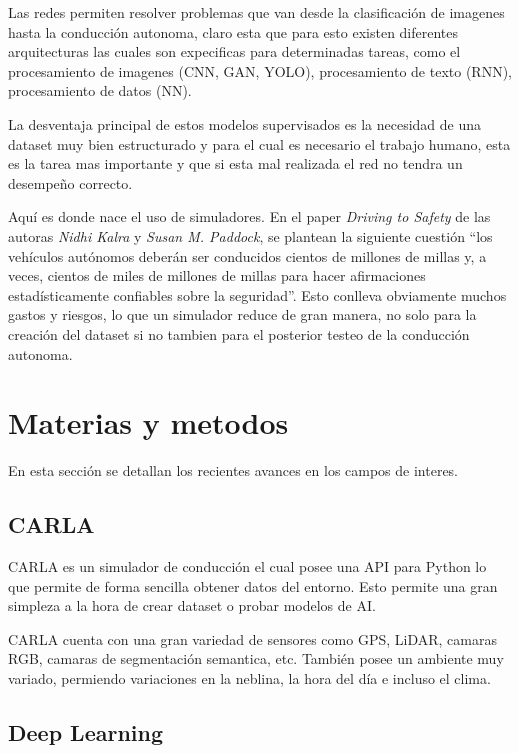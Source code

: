 \documentclass[]{IEEEtran}
\begin{document}
    Las redes permiten resolver problemas que van desde la clasificación de imagenes hasta la conducción autonoma, claro esta 
    que para esto existen diferentes arquitecturas las cuales son expecificas para determinadas tareas, como el procesamiento de imagenes (CNN, GAN, YOLO), 
    procesamiento de texto (RNN), procesamiento de datos (NN).

    La desventaja principal de estos modelos supervisados es la necesidad de una dataset muy bien estructurado y para el cual es necesario 
    el trabajo humano, esta es la tarea mas importante y que si esta mal realizada el red no tendra un desempeño correcto.

    Aquí es donde nace el uso de simuladores. En el paper \textit{Driving to Safety} \cite{Driving-to-safety} de las autoras \textit{Nidhi Kalra} y \textit{Susan M. Paddock}, se 
    plantean la siguiente cuestión ``los vehículos autónomos deberán ser conducidos cientos de millones de millas y, a veces, cientos de miles de millones de millas
    para hacer afirmaciones estadísticamente confiables sobre la seguridad''. Esto conlleva obviamente muchos gastos y riesgos, lo que un simulador reduce de gran 
    manera, no solo para la creación del dataset si no tambien para el posterior testeo de la conducción autonoma. 



    \section{Materias y metodos}

    En esta sección se detallan los recientes avances en los campos de interes.


    \subsection{CARLA}

    CARLA \cite{CARLA-Simulator} es un simulador de conducción el cual posee una API para Python lo que 
    permite de forma sencilla obtener datos del entorno. Esto permite una gran simpleza 
    a la hora de crear dataset o probar modelos de AI.
    
    CARLA cuenta con una gran variedad de sensores como GPS, LiDAR, camaras RGB, camaras de segmentación semantica, etc.
    También posee un ambiente muy variado, permiendo variaciones en la neblina, la hora del día e incluso el clima.

    \subsection{Deep Learning}
\end{document}
